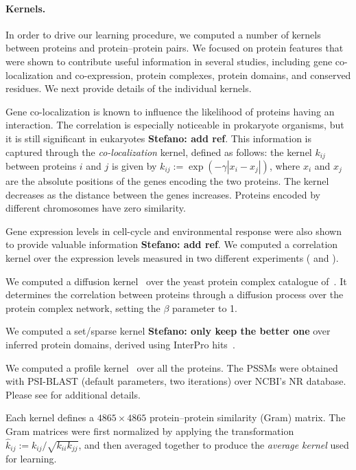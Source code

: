 \documentclass{bioinfo}
\newcommand{\stefano}[1]{{\bf \textcolor{alizarin}{{Stefano: #1}}}}
\begin{document}
\paragraph{Kernels.} In order to drive our learning procedure, we computed a
number of kernels between proteins and protein--protein pairs. We focused on
protein features that were shown to contribute useful information in several
studies, including gene co-localization and co-expression, protein complexes,
protein domains, and conserved residues. We next provide details of the
individual kernels.

Gene co-localization is known to influence the likelihood of proteins having an
interaction. The correlation is especially noticeable in prokaryote organisms,
but it is still significant in eukaryotes \stefano{add ref}.
This information is captured through the {\em co-localization} kernel, defined
as follows: the kernel $k_{ij}$ between proteins $i$ and $j$ is given by
%
$k_{ij} := \exp\left( - \gamma | x_i - x_j | \right)$,
%
where $x_i$ and $x_j$ are the absolute positions of the genes encoding the two
proteins. The kernel decreases as the distance between the genes increases.
Proteins encoded by different chromosomes have zero similarity.

Gene expression levels in cell-cycle and environmental response were also shown
to provide valuable information \stefano{add ref}. We computed a correlation
kernel over the expression levels measured in two different experiments
(\cite{spellman1998comprehensive} and \cite{gasch2000genomic}).

We computed a diffusion kernel~\cite{kondor2002diffusion} over
the yeast protein complex catalogue of~\cite{pu2009up}. It determines the
correlation between proteins through a diffusion process over the protein
complex network, setting the $\beta$ parameter to 1.

We computed a set/sparse kernel \stefano{only keep the better one} over
inferred protein domains, derived using InterPro
hits~\cite{mitchell2015interpro}.

We computed a profile kernel~\cite{kuang2005profile,hamp2013accelerating} over
all the proteins. The PSSMs were obtained with PSI-BLAST (default parameters,
two iterations) over NCBI's NR database. Please see \cite{kuang2005profile}
for additional details.

Each kernel defines a $4865 \times 4865$ protein--protein similarity (Gram)
matrix. The Gram matrices were first normalized by applying the
transformation $\hat{k}_{ij} := k_{ij}/\sqrt{k_{ii} k_{jj}}$, and then
averaged together to produce the {\em average kernel} used for learning.
\end{document}
